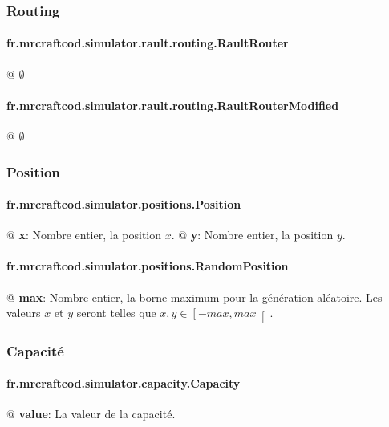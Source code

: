 \documentclass[final]{polytech/polytech}
\begin{document}
			\subsubsection{Routing}
				\paragraph{fr.mrcraftcod.simulator.rault.routing.RaultRouter}
					\begin{easylist}[itemize]
						@ $\emptyset$
					\end{easylist}
					
				\paragraph{fr.mrcraftcod.simulator.rault.routing.RaultRouterModified}
					\begin{easylist}[itemize]
						@ $\emptyset$
					\end{easylist}
					
			\subsubsection{Position\label{sec:jsonconf:pos}}
				\paragraph{fr.mrcraftcod.simulator.positions.Position}
					\begin{easylist}[itemize]
						@ \textbf{x}: Nombre entier, la position $x$.
						@ \textbf{y}: Nombre entier, la position $y$.
					\end{easylist}
					
				\paragraph{fr.mrcraftcod.simulator.positions.RandomPosition}
					\begin{easylist}[itemize]
						@ \textbf{max}: Nombre entier, la borne maximum pour la génération aléatoire. Les valeurs $x$ et $y$ seront telles que $x,y\in\left[-max, max\right[$.
					\end{easylist}
			
			\subsubsection{Capacité\label{sec:jsonconf:capacity}}
				\paragraph{fr.mrcraftcod.simulator.capacity.Capacity}
					\begin{easylist}[itemize]
						@ \textbf{value}: La valeur de la capacité.
					\end{easylist}
					
\end{document}

